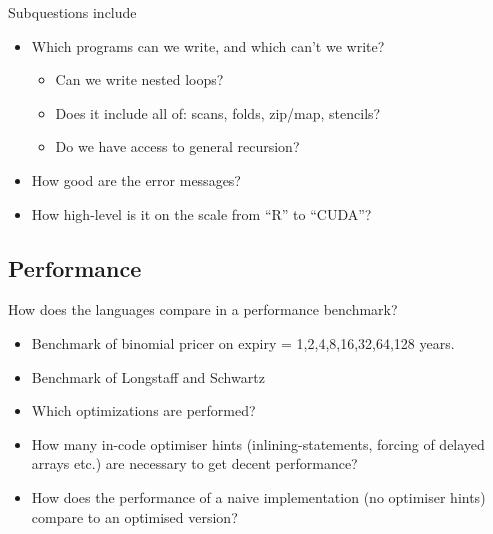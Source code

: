 Subquestions include
\begin{itemize}
\item Which programs can we write, and which can't we write?
  \begin{itemize}
  \item Can we write nested loops?
  \item Does it include all of: scans, folds, zip/map, stencils?
  \item Do we have access to general recursion?
  \end{itemize}
\item How good are the error messages?
\item How high-level is it on the scale from ``R'' to ``CUDA''?
\end{itemize}

\subsection{Performance} How does the languages compare in a
performance benchmark?
\begin{itemize}
\item Benchmark of binomial pricer on expiry = 1,2,4,8,16,32,64,128 years.
\item Benchmark of Longstaff and Schwartz
\item Which optimizations are performed?
\item How many in-code optimiser hints (inlining-statements, forcing
  of delayed arrays etc.) are necessary to get decent performance?
\item How does the performance of a naive implementation (no
  optimiser hints) compare to an optimised version?
\end{itemize}




